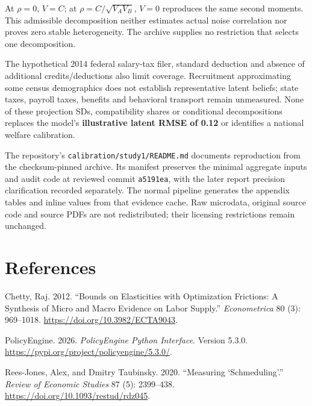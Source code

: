 \documentclass[
  11pt,
  letterpaper,
  DIV=11,
  numbers=noendperiod]{scrartcl}
\newlength{\cslhangindent}
\newenvironment{CSLReferences}[2] %
 {\begin{list}{}{%
  \setlength{\itemindent}{0pt}
  \setlength{\leftmargin}{0pt}
  \setlength{\parsep}{0pt}
  \ifodd #1
   \setlength{\leftmargin}{\cslhangindent}
   \setlength{\itemindent}{-1\cslhangindent}
  \fi
  \setlength{\itemsep}{#2\baselineskip}}}
 {\end{list}}
\begin{document}
At \(\rho=0\), \(V=C\); at \(\rho=C/\sqrt{V_AV_B}\), \(V=0\) reproduces
the same second moments. This admissible decomposition neither estimates
actual noise correlation nor proves zero stable heterogeneity. The
archive supplies no restriction that selects one decomposition.

The hypothetical 2014 federal salary-tax filer, standard deduction and
absence of additional credits/deductions also limit coverage.
Recruitment approximating some census demographics does not establish
representative latent beliefs; state taxes, payroll taxes, benefits and
behavioral transport remain unmeasured. None of these projection SDs,
compatibility shares or conditional decompositions replaces the model's
\textbf{illustrative latent RMSE of 0.12} or identifies a national
welfare calibration.

The repository's \texttt{calibration/study1/README.md} documents
reproduction from the checksum-pinned archive. Its manifest preserves
the minimal aggregate inputs and audit code at reviewed commit
\texttt{a5191ea}, with the later report precision clarification recorded
separately. The normal pipeline generates the appendix tables and inline
values from that evidence cache. Raw microdata, original source code and
source PDFs are not redistributed; their licensing restrictions remain
unchanged.

\newpage{}

\section*{References}\label{references}

\protect{}\label{refs}
\begin{CSLReferences}{1}{1}
Chetty, Raj. 2012. {``Bounds on Elasticities with Optimization
Frictions: A Synthesis of Micro and Macro Evidence on Labor Supply.''}
\emph{Econometrica} 80 (3): 969--1018.
\url{https://doi.org/10.3982/ECTA9043}.

PolicyEngine. 2026. \emph{PolicyEngine Python Interface}. Version 5.3.0.
\url{https://pypi.org/project/policyengine/5.3.0/}.

Rees-Jones, Alex, and Dmitry Taubinsky. 2020. {``Measuring
{`Schmeduling'}.''} \emph{Review of Economic Studies} 87 (5): 2399--438.
\url{https://doi.org/10.1093/restud/rdz045}.

\end{CSLReferences}
\end{document}
